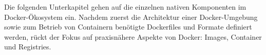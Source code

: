 \documentclass[../main.tex]{subfiles}
\begin{document}



		Die folgenden Unterkapitel gehen auf die einzelnen nativen Komponenten im Docker-Ökosystem ein. Nachdem zuerst die Architektur einer Docker-Umgebung sowie zum Betrieb von Containern benötigte Dockerfiles und Formate definiert werden, rückt der Fokus auf praxisnähere Aspekte von Docker: Images, Container und Registries.


\end{document}
